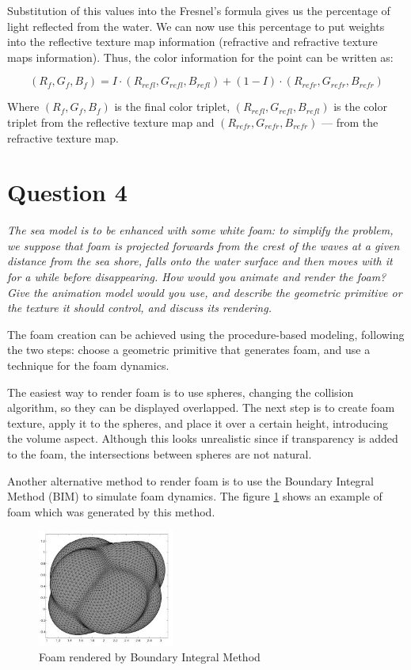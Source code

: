 \documentclass{article}
\begin{document}
Substitution of this values into the Fresnel's formula gives us the
percentage of light reflected from the water. We can now use this
percentage to put weights into the reflective texture map information
(refractive and refractive texture maps information). Thus, the color
information for the point can be written as:

\begin{equation}
  (R_f,G_f,B_f) = I\cdot(R_{refl},G_{refl},B_{refl}) +
  (1-I)\cdot(R_{refr},G_{refr},B_{refr})
\end{equation}

Where $(R_f,G_f,B_f)$ is the final color triplet,
$(R_{refl},G_{refl},B_{refl})$ is the color triplet from the reflective
texture map and $(R_{refr},G_{refr},B_{refr})$ --- from the refractive
texture map. 

\section{Question 4}

\emph{The sea model is to be enhanced with some white foam: to simplify
the problem, we suppose that foam is projected forwards from the crest
of the waves at a given distance from the sea shore, falls onto the
water surface and then moves with it for a while before disappearing.
How would you animate and render the foam? Give the animation model
would you use, and describe the geometric primitive or the texture it
should control, and discuss its rendering.}

The foam creation can be achieved using the procedure-based modeling, following the two steps: choose a geometric primitive that generates foam, and use a technique for the foam dynamics.

The easiest way to render foam is to use spheres, changing the collision
algorithm, so they can be displayed overlapped. The next step is to create foam
texture, apply it to the spheres, and place it over a certain height,
introducing the volume aspect.  Although this looks unrealistic since if 
transparency is added to the foam, the intersections between spheres are not natural. 

Another alternative method to render foam is to use the Boundary Integral Method (BIM) to simulate foam dynamics\cite{bim}. The figure \ref{fig:dim-foam} shows an example of foam which was generated by this method.

\begin{figure}[H] \centering
  \includegraphics[width=0.4\textwidth]{image/dim01.png} \caption{Foam
  rendered by Boundary Integral Method} \label{fig:dim-foam}
\end{figure}
\end{document}
